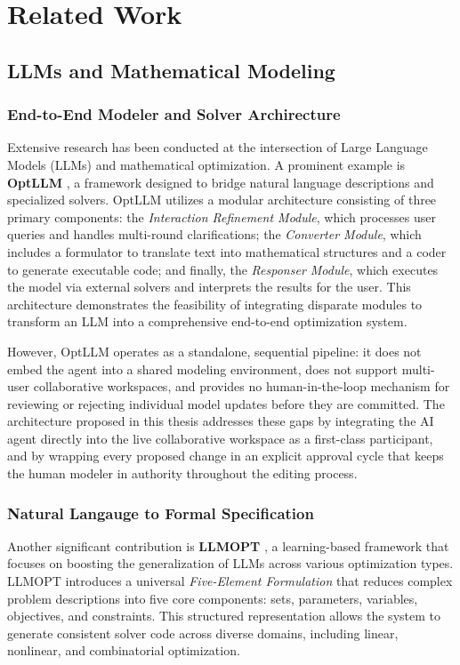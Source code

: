 \chapter{Related Work}
\section{LLMs and Mathematical Modeling}
\subsection{End-to-End Modeler and Solver Archirecture}

Extensive research has been conducted at the intersection of Large Language Models (LLMs) and mathematical optimization. A prominent example is \textbf{OptLLM} \cite{zhang2024solvinggeneralnaturallanguagedescriptionoptimization}, a framework designed to bridge natural language descriptions and specialized solvers. OptLLM utilizes a modular architecture consisting of three primary components: the \emph{Interaction Refinement Module}, which processes user queries and handles multi-round clarifications; the \emph{Converter Module}, which includes a formulator to translate text into mathematical structures and a coder to generate executable code; and finally, the \emph{Responser Module}, which executes the model via external solvers and interprets the results for the user. This architecture demonstrates the feasibility of integrating disparate modules to transform an LLM into a comprehensive end-to-end optimization system. 

However, OptLLM operates as a standalone, sequential pipeline: it does not embed the agent into a shared modeling environment, does not support multi-user collaborative workspaces, and provides no human-in-the-loop mechanism for reviewing or rejecting individual model updates before they are committed. The architecture proposed in this thesis addresses these gaps by integrating the AI agent directly into the live collaborative workspace as a first-class participant, and by wrapping every proposed change in an explicit approval cycle that keeps the human modeler in authority throughout the editing process.


\subsection{Natural Langauge to Formal Specification}
Another significant contribution is \textbf{LLMOPT} \cite{jiang2025llmoptlearningdefinesolve}, a learning-based framework that focuses on boosting the generalization of LLMs across various optimization types. LLMOPT introduces a universal \emph{Five-Element Formulation} that reduces complex problem descriptions into five core components: sets, parameters, variables, objectives, and constraints. This structured representation allows the system to generate consistent solver code across diverse domains, including linear, nonlinear, and combinatorial optimization.

